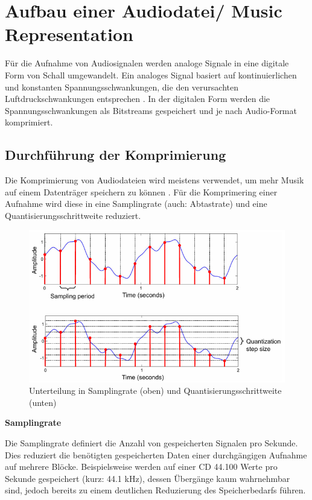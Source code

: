 %
\section{Aufbau einer Audiodatei/ Music Representation}
%

Für die Aufnahme von Audiosignalen werden analoge Signale in eine digitale Form von Schall umgewandelt. Ein analoges Signal basiert auf kontinuierlichen und konstanten Spannungsschwankungen, die den verursachten Luftdruckschwankungen entsprechen \parencite{digital_representation}. In der digitalen Form werden die Spannungsschwankungen als Bitstreams gespeichert und je nach Audio-Format komprimiert.

%
\subsection{Durchführung der Komprimierung}
\label{compression}
%

Die Komprimierung von Audiodateien wird meistens verwendet, um mehr Musik auf einem Datenträger speichern zu können \parencite{what_is_audio_compression}. Für die Komprimering einer Aufnahme wird diese in eine Samplingrate (auch: Abtastrate) und eine Quantisierungsschrittweite reduziert.

%
\begin{figure}[h]
    \includegraphics[width=1\textwidth]{images/Samplingrate_Quantisierungsgröße.PNG}
    \caption{Unterteilung in Samplingrate (oben) und Quantisierungsschrittweite (unten)}
    \label{fig:samplingrate}
\end{figure}
%

\par

%
\textbf{Samplingrate}
%

Die Samplingrate definiert die Anzahl von gespeicherten Signalen pro Sekunde. Dies reduziert die benötigten gespeicherten Daten einer durchgängigen Aufnahme auf mehrere Blöcke. Beispielsweise werden auf einer CD 44.100 Werte pro Sekunde gespeichert (kurz: 44.1 kHz), dessen Übergänge kaum wahrnehmbar sind, jedoch bereits zu einem deutlichen Reduzierung des Speicherbedarfs führen.

